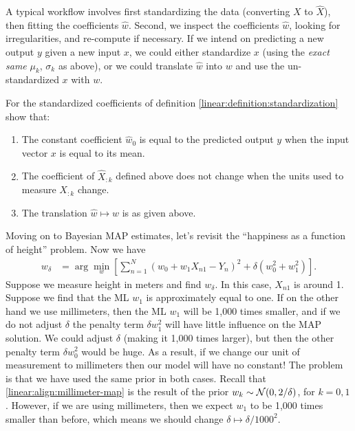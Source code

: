 A typical workflow involves first standardizing the data (converting $X$ to $\hat X$), then fitting the coefficients $\hat w$.  Second, we inspect the coefficients $\hat w$, looking for irregularities, and re-compute if necessary.  If we intend on predicting a new output $y$ given a new input $x$, we could either standardize $x$ (using the \emph{exact same} $\mu_k$, $\sigma_k$ as above), or we could translate $\hat w$ into $w$ and use the un-standardized $x$ with $w$.  

\begin{exercise}
  For the standardized coefficients of definition \ref{linear:definition:standardization} show that:
  \begin{enumerate}
    \item The constant coefficient $\hat w_0$ is equal to the predicted output $y$ when the input vector $x$ is equal to its mean.
    \item The coefficient of $\hat X_{:k}$ defined above does not change when the units used to measure $X_{:k}$ change.
    \item The translation $\hat w\mapsto w$ is as given above.
  \end{enumerate}
\end{exercise}

Moving on to Bayesian MAP estimates, let's revisit the ``happiness as a function of height'' problem.  Now we have
\begin{align}
  w_\delta &= \arg\min_w \left[ \sum_{n=1}^N \left( w_0 + w_1 X_{n1} - Y_n \right)^2 + \delta (w_0^2 + w_1^2)\right].
  \label{linear:align:millimeter-map}
\end{align}
Suppose we measure height in meters and find $w_\delta$.  In this case, $X_{n1}$ is around 1.  Suppose we find that the ML $w_1$ is approximately equal to one.  If on the other hand we use millimeters, then the ML $w_1$ will be 1,000 times smaller, and if we do not adjust $\delta$ the penalty term $\delta w_1^2$ will have little influence on the MAP solution.  We could adjust $\delta$ (making it 1,000 times larger), but then the other penalty term $\delta w_0^2$ would be huge.  As a result, if we change our unit of measurement to millimeters then our model will have no constant!  The problem is that we have used the same prior in both cases.  Recall that \eqref{linear:align:millimeter-map} is the result of the prior $w_k\sim{\mathcal N}(0, 2/\delta)$, for $k=0,1$.  However, if we are using millimeters, then we expect $w_1$ to be 1,000 times smaller than before, which means we should change $\delta\mapsto\delta/1000^2$.

